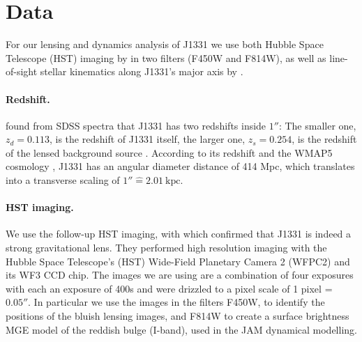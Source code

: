 \section{Data} \label{sec:data}

For our lensing and dynamics analysis of J1331 we use both Hubble Space Telescope (HST) imaging by \cite{SWELLSI} in two filters (F450W and F814W), as well as line-of-sight stellar kinematics along J1331's major axis by \citet{SWELLSV}.

\paragraph{Redshift.} \citet{SWELLSI} found from SDSS spectra that J1331 has two redshifts inside $1''$: The smaller one, $z_d = 0.113$, is the redshift of J1331 itself, the larger one, $z_s = 0.254$, is the redshift of the lensed background source \citep{SWELLSIII}. According to its redshift and the WMAP5 cosmology \citep{WMAP5cosm}, J1331 has an angular diameter distance of 414 Mpc, which translates into a transverse scaling of $1'' \hat{=} 2.01~\text{kpc}$.

\paragraph{HST imaging.} We use the follow-up HST imaging, with which \citet{SWELLSI} confirmed that J1331 is indeed a strong gravitational lens. They performed high resolution imaging with the Hubble Space Telescope's (HST) Wide-Field Planetary Camera 2 (WFPC2) and its WF3 CCD chip.  The images we are using are a combination of four exposures with each an exposure of 400s and were drizzled to a pixel scale of 1 pixel = $0.05''$. In particular we use the images in the filters F450W, to identify the positions of the bluish lensing images, and F814W to create a surface brightness MGE model of the reddish bulge (I-band), used in the JAM dynamical modelling.


